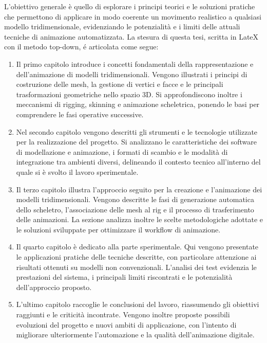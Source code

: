 L’obiettivo generale è quello di esplorare i principi teorici e le soluzioni pratiche che permettono di applicare in modo coerente un movimento realistico a qualsiasi modello tridimensionale, evidenziando le potenzialità e i limiti delle attuali tecniche di animazione automatizzata. La stesura di questa tesi, scritta in LateX con il metodo top-down, é articolata come segue: 
\begin {enumerate}
    \item Il primo capitolo introduce i concetti fondamentali della rappresentazione e dell’animazione di modelli tridimensionali. Vengono illustrati i principi di costruzione delle mesh, la gestione di vertici e facce e le principali trasformazioni geometriche nello spazio 3D. Si approfondiscono inoltre i meccanismi di rigging, skinning e animazione scheletrica, ponendo le basi per comprendere le fasi operative successive.
    \item Nel secondo capitolo vengono descritti gli strumenti e le tecnologie utilizzate per la realizzazione del progetto. Si analizzano le caratteristiche dei software di modellazione e animazione, i formati di scambio e le modalità di integrazione tra ambienti diversi, delineando il contesto tecnico all’interno del quale si è svolto il lavoro sperimentale.
    \item Il terzo capitolo illustra l’approccio seguito per la creazione e l’animazione dei modelli tridimensionali. Vengono descritte le fasi di generazione automatica dello scheletro, l’associazione delle mesh al rig e il processo di trasferimento delle animazioni. La sezione analizza inoltre le scelte metodologiche adottate e le soluzioni sviluppate per ottimizzare il workflow di animazione.
    \item Il quarto capitolo è dedicato alla parte sperimentale. Qui vengono presentate le applicazioni pratiche delle tecniche descritte, con particolare attenzione ai risultati ottenuti su modelli non convenzionali. L’analisi dei test evidenzia le prestazioni del sistema, i principali limiti riscontrati e le potenzialità dell’approccio proposto.
    \item L’ultimo capitolo raccoglie le conclusioni del lavoro, riassumendo gli obiettivi raggiunti e le criticità incontrate. Vengono inoltre proposte possibili evoluzioni del progetto e nuovi ambiti di applicazione, con l’intento di migliorare ulteriormente l’automazione e la qualità dell’animazione digitale.
\end{enumerate}